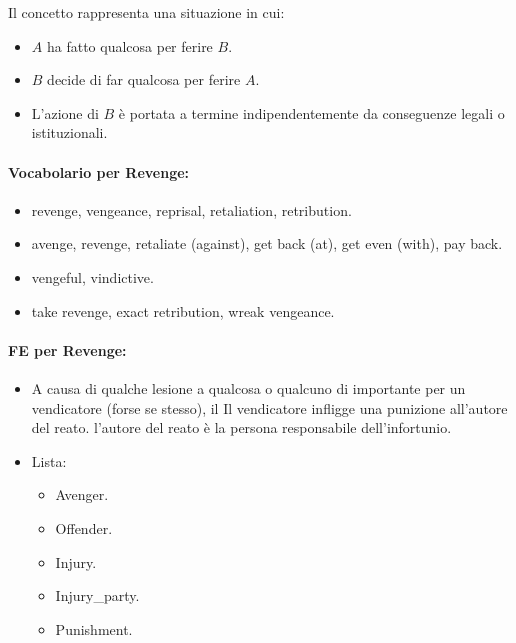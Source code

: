 Il concetto  rappresenta una situazione in cui:

\begin{itemize}
  \item $A$ ha fatto qualcosa per ferire $B$. 
  \item $B$ decide di far qualcosa per ferire $A$. 
  \item L'azione di $B$ è portata a termine indipendentemente da conseguenze legali o istituzionali.
\end{itemize}

\paragraph{Vocabolario per Revenge:}

\begin{itemize}
  \item {} revenge, vengeance, reprisal, retaliation, retribution. 
  \item {} avenge, revenge, retaliate (against), get back (at), get even (with), pay back. 
  \item {} vengeful, vindictive. 
  \item {} take revenge, exact retribution, wreak vengeance.
\end{itemize}

\paragraph{FE per Revenge:}

\begin{itemize}
  \item A causa di qualche lesione a qualcosa o qualcuno di importante per un vendicatore (forse se stesso), il Il vendicatore infligge una punizione all'autore del reato. l'autore del reato è la persona responsabile dell'infortunio.
  \item Lista:
    \begin{itemize}
      \item Avenger. 
      \item Offender. 
      \item Injury. 
      \item Injury\_party. 
      \item Punishment.
    \end{itemize}
\end{itemize}

